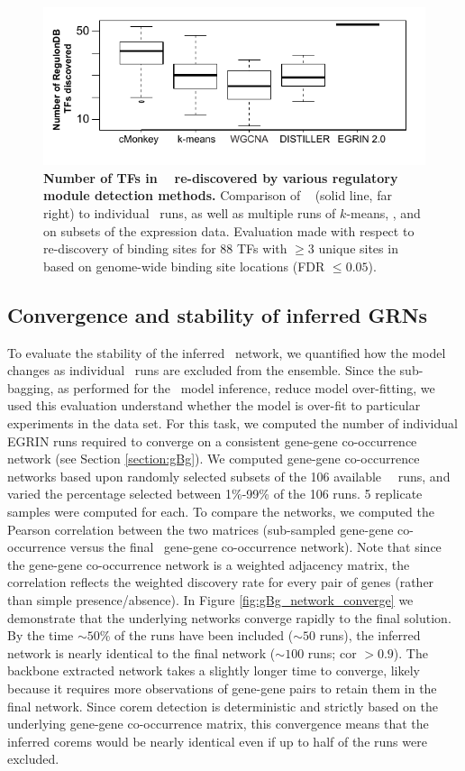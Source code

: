 \begin{figure}[h!]
\centering
\includegraphics[width=0.6\linewidth]{figures/ensemble_comparison_regDB.pdf}
\caption[Number of TFs in \rdb~ re-discovered by various regulatory module detection methods.]  {{\bf Number of TFs in \rdb~ re-discovered by various regulatory module detection methods.} Comparison of \egrine~ (solid line, far right) to individual \cm\ runs, as well as multiple runs of $k$-means, , and  on subsets of the expression data. Evaluation made with respect to re-discovery of binding sites for 88 TFs with $\geq 3$ unique sites in \rdb~ based on genome-wide binding site locations (FDR $\leq 0.05$).} 
\label{fig:ensemble_comparison_regDB}
\end{figure}

\subsection{Convergence and stability of inferred GRNs}

To evaluate the stability of the inferred \egrine\ network, we quantified how the model changes as individual \cm\ runs are excluded from the ensemble. Since the sub-bagging, as performed for the \egrine\ model inference, reduce model over-fitting, we used this evaluation understand whether the model is over-fit to particular experiments in the data set. For this task, we computed the number of individual EGRIN runs required to converge on a consistent gene-gene co-occurrence network (see Section \ref{section:gBg}). We computed gene-gene co-occurrence networks based upon randomly selected subsets of the 106 available \eco\ \cm\ runs, and varied the percentage selected between 1\%-99\% of the 106 runs. 5 replicate samples were computed for each. To compare the networks, we computed the Pearson correlation between the two matrices (sub-sampled gene-gene co-occurrence versus the final \egrine\ gene-gene co-occurrence network). Note that since the gene-gene co-occurrence network is a weighted adjacency matrix, the correlation reflects the weighted discovery rate for every pair of genes (rather than simple presence/absence). In Figure \ref{fig:gBg_network_converge} we demonstrate that the underlying networks converge rapidly to the final solution. By the time $\sim 50$\% of the runs have been included ($\sim 50$ runs), the inferred network is nearly identical to the final network ($\sim 100$ runs; cor $> 0.9$). The backbone extracted network takes a slightly longer time to converge, likely because it requires more observations of gene-gene pairs to retain them in the final network. Since corem detection is deterministic and strictly based on the underlying gene-gene co-occurrence matrix, this convergence means that the inferred corems would be nearly identical even if up to half of the runs were excluded.

